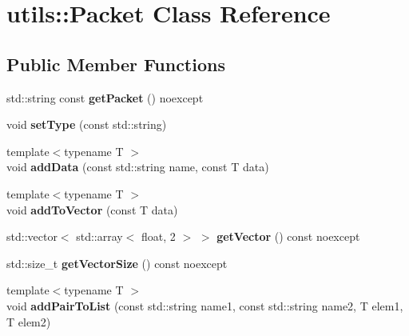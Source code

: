 \hypertarget{classutils_1_1_packet}{}\section{utils\+:\+:Packet Class Reference}
\label{classutils_1_1_packet}
\subsection*{Public Member Functions}
\begin{DoxyCompactItemize}
\item 
\mbox{\label{classutils_1_1_packet_a2b59afcf9052ea39f4fbc0b3543f04f0}} 
std\+::string const {\bfseries get\+Packet} () noexcept
\item 
\mbox{\label{classutils_1_1_packet_abf5ca12195881bf83252459b1243b1ae}} 
void {\bfseries set\+Type} (const std\+::string)
\item 
\mbox{\label{classutils_1_1_packet_aca48ed11345a8a34847fa518411b8e03}} 
{\footnotesize template$<$typename T $>$ }\\void {\bfseries add\+Data} (const std\+::string name, const T data)
\item 
\mbox{\label{classutils_1_1_packet_a484ff550a5ed540109274819b779e4f8}} 
{\footnotesize template$<$typename T $>$ }\\void {\bfseries add\+To\+Vector} (const T data)
\item 
\mbox{\label{classutils_1_1_packet_a9eb149a9ee7e34e43efd04309222f765}} 
std\+::vector$<$ std\+::array$<$ float, 2 $>$ $>$ {\bfseries get\+Vector} () const noexcept
\item 
\mbox{\label{classutils_1_1_packet_a295d6f0e6e90db9c0e2647b4f6ffe93b}} 
std\+::size\+\_\+t {\bfseries get\+Vector\+Size} () const noexcept
\item 
\mbox{\label{classutils_1_1_packet_aba28b71a578335ed5ebdacb9660ac6c5}} 
{\footnotesize template$<$typename T $>$ }\\void {\bfseries add\+Pair\+To\+List} (const std\+::string name1, const std\+::string name2, T elem1, T elem2)

\end{DoxyCompactItemize}
